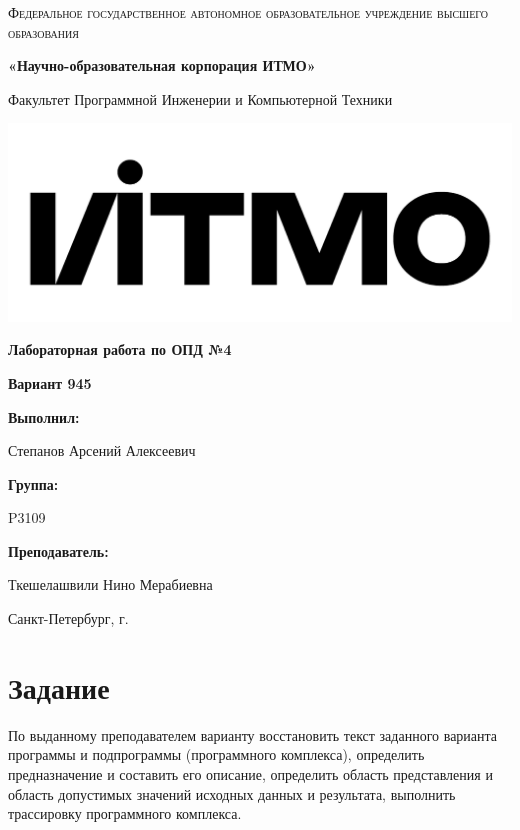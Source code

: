 \documentclass[12pt,a4paper]{report}
\begin{document}
\begin{titlepage} 
	\centering
	{
        \scshape
        Федеральное государственное автономное образовательное учреждение высшего образования
        \par
        \textbf{«Научно-образовательная корпорация ИТМО»}
        \par
        \vspace*{1cm}
        Факультет Программной Инженерии и Компьютерной Техники
        \par
    }
    \vspace*{0.6cm}
    \includegraphics[width=\textwidth]{logo.png}
    {
        \Large
        \textbf{Лабораторная работа по ОПД №4}
        \par
        \normalsize
        \vspace*{0.75cm}
        \textbf{Вариант 945}
        \par
    }
    \vfill
    \hfill\begin{minipage}{\dimexpr\textwidth-7.8cm}
        \textbf{Выполнил:}\par
        Степанов Арсений Алексеевич\par
        \vspace*{0.15cm}
        \textbf{Группа:}\par
        P3109\par
        \vspace*{0.15cm}
        \textbf{Преподаватель:}\par
        Ткешелашвили Нино Мерабиевна\par
    \end{minipage}
    \vfill
    Санкт-Петербург, \the\year{}г.
\end{titlepage}  
    \section*{Задание}
    По выданному преподавателем варианту восстановить текст заданного варианта программы и подпрограммы (программного комплекса), определить предназначение и составить его описание, определить область представления и область допустимых значений исходных данных и результата, выполнить трассировку программного комплекса.
\end{document}
